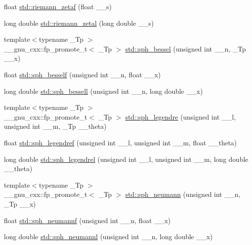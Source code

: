 \begin{DoxyCompactItemize}
\item 
float \hyperlink{group__mathsf__std_gaf92063315061a56d3e2c4053156d968e}{std\+::riemann\+\_\+zetaf} (float \+\_\+\+\_\+s)
\item 
long double \hyperlink{group__mathsf__std_ga1e92da3b878d75270f38d3ec9b513086}{std\+::riemann\+\_\+zetal} (long double \+\_\+\+\_\+s)
\item 
{\footnotesize template$<$typename \+\_\+\+Tp $>$ }\\\+\_\+\+\_\+gnu\+\_\+cxx\+::fp\+\_\+promote\+\_\+t$<$ \+\_\+\+Tp $>$ \hyperlink{group__mathsf__std_gad125841d7c85e461cb8954952e3a17c8}{std\+::sph\+\_\+bessel} (unsigned int \+\_\+\+\_\+n, \+\_\+\+Tp \+\_\+\+\_\+x)
\item 
float \hyperlink{group__mathsf__std_ga534e36e1dcefad8daec98920db16eec4}{std\+::sph\+\_\+besself} (unsigned int \+\_\+\+\_\+n, float \+\_\+\+\_\+x)
\item 
long double \hyperlink{group__mathsf__std_ga11d72b1af81ce9da3c878a25087ee927}{std\+::sph\+\_\+bessell} (unsigned int \+\_\+\+\_\+n, long double \+\_\+\+\_\+x)
\item 
{\footnotesize template$<$typename \+\_\+\+Tp $>$ }\\\+\_\+\+\_\+gnu\+\_\+cxx\+::fp\+\_\+promote\+\_\+t$<$ \+\_\+\+Tp $>$ \hyperlink{group__mathsf__std_gacef0d41a7ce572a9ace3437498794ed0}{std\+::sph\+\_\+legendre} (unsigned int \+\_\+\+\_\+l, unsigned int \+\_\+\+\_\+m, \+\_\+\+Tp \+\_\+\+\_\+theta)
\item 
float \hyperlink{group__mathsf__std_gaae635d28c06a3be2679901b382090852}{std\+::sph\+\_\+legendref} (unsigned int \+\_\+\+\_\+l, unsigned int \+\_\+\+\_\+m, float \+\_\+\+\_\+theta)
\item 
long double \hyperlink{group__mathsf__std_ga2f6618dea1847f09fd67f3c974c1910d}{std\+::sph\+\_\+legendrel} (unsigned int \+\_\+\+\_\+l, unsigned int \+\_\+\+\_\+m, long double \+\_\+\+\_\+theta)
\item 
{\footnotesize template$<$typename \+\_\+\+Tp $>$ }\\\+\_\+\+\_\+gnu\+\_\+cxx\+::fp\+\_\+promote\+\_\+t$<$ \+\_\+\+Tp $>$ \hyperlink{group__mathsf__std_ga01cdd716aaca8ff3c08f307800fd5220}{std\+::sph\+\_\+neumann} (unsigned int \+\_\+\+\_\+n, \+\_\+\+Tp \+\_\+\+\_\+x)
\item 
float \hyperlink{group__mathsf__std_ga789143122fa99536329bc2d1b1aac2f0}{std\+::sph\+\_\+neumannf} (unsigned int \+\_\+\+\_\+n, float \+\_\+\+\_\+x)
\item 
long double \hyperlink{group__mathsf__std_ga3cededa9b6e4601f190c3811e6aabfd6}{std\+::sph\+\_\+neumannl} (unsigned int \+\_\+\+\_\+n, long double \+\_\+\+\_\+x)
\end{DoxyCompactItemize}


